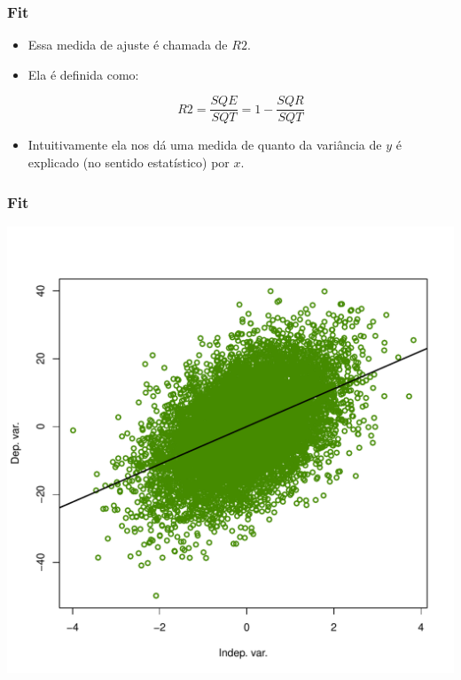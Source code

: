 \documentclass[10pt,slides,xcolor=pdftex,dvipsnames,table]{beamer}
\begin{document}
\begin{frame}[fragile]
	\frametitle{Fit}
	
\begin{itemize}\itemsep1.2em 

\item Essa medida de ajuste é chamada de $R2$.

\item Ela é definida como:

$$ R2 = \frac{SQE}{SQT} = 1- \frac{SQR}{SQT}$$

\item Intuitivamente ela nos dá uma medida de quanto da variância de $y$ é explicado (no sentido estatístico) por $x$. 

\end{itemize}

\end{frame}


\begin{frame}[fragile]
	\frametitle{Fit}
	
    \centering
    \includegraphics[height=\textheight]{fit}

\end{frame}

\end{document}
